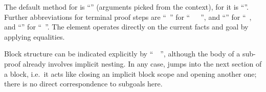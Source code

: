 \begin{isabellebody}
\begin{isamarkuptext}
  The default method for \hyperlink{command.proof}{\mbox{}} is ``\hyperlink{method.Pure.rule}{\mbox{}}''
  (arguments picked from the context), for \hyperlink{command.qed}{\mbox{}} it is
  ``\hyperlink{method.-}{\mbox{}}''.  Further abbreviations for terminal proof steps
  are ``\hyperlink{command.by}{\mbox{}}~'' for
  ``\hyperlink{command.proof}{\mbox{}}~~\hyperlink{command.qed}{\mbox{}}~'', and ``\hyperlink{command.ddot}{\mbox{}}'' for ``\hyperlink{command.by}{\mbox{}}~\hyperlink{method.Pure.rule}{\mbox{}}, and ``\hyperlink{command.dot}{\mbox{}}'' for ``\hyperlink{command.by}{\mbox{}}~\hyperlink{method.this}{\mbox{}}''.  The \hyperlink{command.unfolding}{\mbox{}} element operates
  directly on the current facts and goal by applying equalities.

  \medskip Block structure can be indicated explicitly by ``\hyperlink{command.braceleft}{\mbox{}}~~\hyperlink{command.braceright}{\mbox{}}'', although the body of a sub-proof
  already involves implicit nesting.  In any case, \hyperlink{command.next}{\mbox{}}
  jumps into the next section of a block, i.e.\ it acts like closing
  an implicit block scope and opening another one; there is no direct
  correspondence to subgoals here.


\end{isamarkuptext}
\end{isabellebody}
